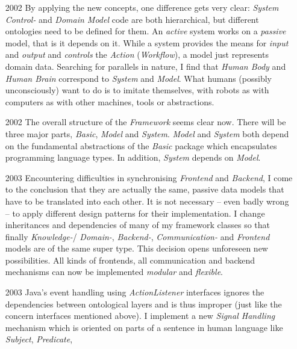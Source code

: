 \begin{itemize}
    \item[2002] By applying the new concepts, one difference gets very clear:
        \emph{System Control-} and \emph{Domain Model} code are both
        hierarchical, but different ontologies need to be defined for them.
        An \emph{active} system works on a \emph{passive} model, that is it
        depends on it. While a system provides the means for \emph{input} and
        \emph{output} and \emph{controls} the \emph{Action} (\emph{Workflow}),
        a model just represents domain data. Searching for parallels in nature,
        I find that \emph{Human Body} and \emph{Human Brain} correspond to
        \emph{System} and \emph{Model}. What humans (possibly unconsciously)
        want to do is to imitate themselves, with robots as with computers as
        with other machines, tools or abstractions.
    \item[2002] The overall structure of the \emph{Framework} seems clear now.
        There will be three major parts, \emph{Basic}, \emph{Model} and
        \emph{System}. \emph{Model} and \emph{System} both depend on the
        fundamental abstractions of the \emph{Basic} package which encapsulates
        programming language types. In addition, \emph{System} depends on
        \emph{Model}.
    \item[2003] Encountering difficulties in synchronising \emph{Frontend} and
        \emph{Backend}, I come to the conclusion that they are actually the
        same, passive data models that have to be translated into each other.
        It is not necessary -- even badly wrong -- to apply different design
        patterns for their implementation. I change inheritances and
        dependencies of many of my framework classes so that finally
        \emph{Knowledge-}/ \emph{Domain-}, \emph{Backend-}, \emph{Communication-}
        and \emph{Frontend} models are of the same super type. This decision
        opens unforeseen new possibilities. All kinds of frontends, all
        communication and backend mechanisms can now be implemented
        \emph{modular} and \emph{flexible}.
    \item[2003] Java's event handling using \emph{ActionListener} interfaces
        ignores the dependencies between ontological layers and is thus improper
        (just like the concern interfaces mentioned above). I implement a new
        \emph{Signal Handling} mechanism which is oriented on parts of a
        sentence in human language like \emph{Subject}, \emph{Predicate},

\end{itemize}
